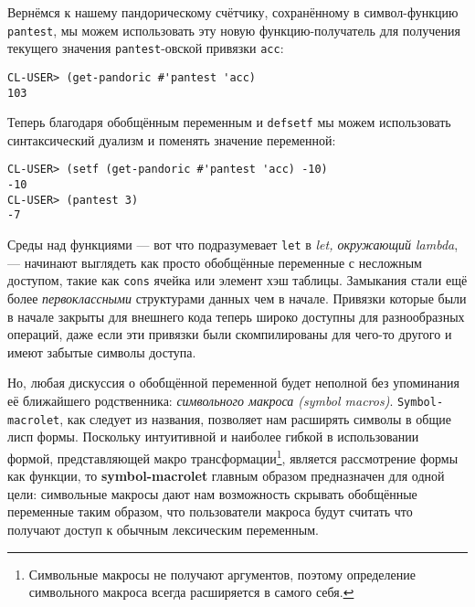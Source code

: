 Вернёмся к нашему пандорическому счётчику, сохранённому в символ-функцию \verb"pantest", мы можем использовать эту новую функ\-цию-по\-лу\-ча\-тель для получения текущего значения \verb"pantest"-овской привязки \verb"acc":

\begin{verbatim}
CL-USER> (get-pandoric #'pantest 'acc)
103
\end{verbatim}

Теперь благодаря обобщённым переменным и \verb"defsetf" мы можем использовать синтаксический дуализм и поменять значение переменной:

\begin{verbatim}
CL-USER> (setf (get-pandoric #'pantest 'acc) -10)
-10
CL-USER> (pantest 3)
-7
\end{verbatim}

Среды над функциями --- вот что подразумевает \verb"let" в \emph{let, окружающий lambda}, --- начинают выглядеть как просто обобщённые переменные с несложным доступом, такие как \verb"cons" ячейка или элемент хэш таблицы. Замыкания стали ещё более \emph{первоклассными} структурами данных чем в начале. Привязки которые были в начале закрыты для внешнего кода теперь широко доступны для разнообразных операций, даже если эти привязки были скомпилированы для чего-то другого и имеют забытые символы доступа.

Но, любая дискуссия о обобщённой переменной будет неполной без упоминания её ближайшего родственника: \emph{символьного макроса (symbol macros)}. \verb"Symbol-macrolet", как следует из названия, позволяет нам расширять символы в общие лисп формы. Поскольку интуитивной и наиболее гибкой в использовании формой, представляющей макро трансформации\footnote{Символьные макросы не получают аргументов, поэтому определение символьного макроса всегда расширяется в самого себя.}, является рассмотрение формы как функции, то \textbf{sym\-bol\--\-mac\-ro\-let} главным образом предназначен для одной цели: символьные макросы дают нам возможность скрывать обобщённые переменные таким образом, что пользователи макроса будут считать что получают доступ к обычным лексическим переменным.

